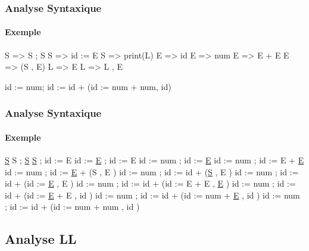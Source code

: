 \documentclass{beamer}
\begin{document}
\begin{frame}\frametitle{Analyse Syntaxique}\framesubtitle{Exemple}

S => S ; S\newline
S => id := E\newline
S => print(L)\newline
E => id\newline
E => num\newline
E => E + E\newline
E => (S , E)\newline
L => E\newline
L => L , E\newline\newline

id := num; id := id + (id := num + num, id)

\end{frame}

\begin{frame}\frametitle{Analyse Syntaxique}\framesubtitle{Exemple}

\newline\newline
\underline{S}\newline
S ; \underline{S}\newline
\underline{S} ; id := E\newline
id := \underline{E} ; id := E\newline
id := num ; id := \underline{E}\newline
id := num ; id := E + \underline{E}\newline
id := num ; id := \underline{E} + (S , E )\newline
id := num ; id := id + (\underline{S} , E )\newline
id := num ; id := id + (id := \underline{E} , E )\newline
id := num ; id := id + (id := E + E , \underline{E} )\newline
id := num ; id := id + (id := \underline{E} + E , id )\newline
id := num ; id := id + (id := num + \underline{E} , id )\newline
id := num ; id := id + (id := num + num , id )\newline

\end{frame}

\subsection{Analyse LL}
\end{document}

